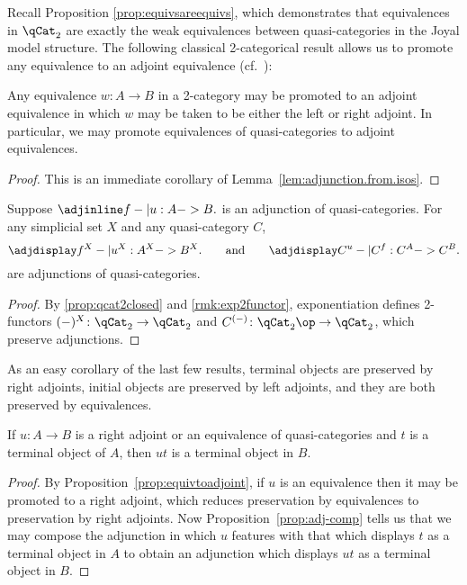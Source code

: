 Recall Proposition \ref{prop:equivsareequivs}, which demonstrates that equivalences in $\qCat_2$ are exactly the weak equivalences between quasi-categories in the Joyal model structure. The following classical 2-categorical result allows us to promote any equivalence to an adjoint equivalence (cf.~\cite[IV.4.1]{Maclane:1971:CWM}):

\begin{prop}\label{prop:equivtoadjoint} Any equivalence $w\colon A\to B$ in a 2-category may be promoted to an adjoint equivalence in which $w$ may be taken to be either the left or right adjoint. In particular, we may promote equivalences of quasi-categories to adjoint equivalences.
\end{prop}

\begin{proof}
  This is an immediate corollary of Lemma~\ref{lem:adjunction.from.isos}. 
\end{proof}

 \begin{prop}\label{prop:expadj} Suppose $\adjinline f -| u : A -> B.$ is an adjunction of quasi-categories. For any simplicial set $X$ and any quasi-category $C$, \[ \adjdisplay f^X-| u^X : A^X-> B^X .\qquad \text{and} \qquad \adjdisplay C^u -| C^f : C^A -> C^B .\] are adjunctions of quasi-categories. 
 \end{prop}
 \begin{proof}
By \ref{prop:qcat2closed} and \ref{rmk:exp2functor}, exponentiation defines 2-functors $(-)^X \colon \qCat_2 \to \qCat_2$ and $C^{(-)} \colon \qCat_2\op \to \qCat_2$, which preserve adjunctions.
 \end{proof}

As an easy corollary of the last few results, terminal objects are preserved by right adjoints, initial objects are preserved by left adjoints, and they are both preserved by equivalences.

\begin{prop}\label{prop:terminaldefn} If $u \colon A \to B$ is a right adjoint or an equivalence of quasi-categories and $t$ is a terminal object of $A$, then $ut$ is a terminal object in $B$.
\end{prop}
\begin{proof} By Proposition~\ref{prop:equivtoadjoint}, if $u$ is an equivalence then it may be promoted to a right adjoint, which reduces preservation by equivalences to preservation by right adjoints. Now Proposition~\ref{prop:adj-comp} tells us that we may compose the adjunction in which $u$ features with that which displays $t$ as a terminal object in $A$ to obtain an adjunction which displays $ut$ as a terminal object in $B$.
\end{proof}

